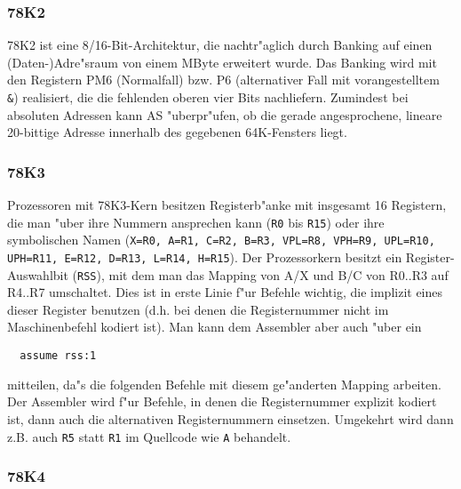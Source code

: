 \documentclass[12pt,a4paper,twoside]{report}
\newcommand{\tty}[1]{{\tt #1}}
\begin{document}

\subsubsection{78K2}

78K2 ist eine 8/16-Bit-Architektur, die nachtr"aglich durch Banking auf
einen (Daten-)Adre"sraum von einem MByte erweitert wurde.  Das Banking
wird mit den Registern PM6 (Normalfall) bzw. P6 (alternativer Fall mit
vorangestelltem \verb!&!) realisiert, die die fehlenden oberen vier Bits
nachliefern.  Zumindest bei absoluten Adressen kann AS "uberpr"ufen, ob
die gerade angesprochene, lineare 20-bittige Adresse innerhalb des
gegebenen 64K-Fensters liegt.


\subsubsection{78K3}

Prozessoren mit 78K3-Kern besitzen Registerb"anke mit insgesamt 16 Registern,
die man "uber ihre Nummern ansprechen kann (\tty{R0} bis \tty{R15}) oder ihre symbolischen
Namen (\tty{X=R0, A=R1, C=R2, B=R3, VPL=R8, VPH=R9, UPL=R10, UPH=R11, E=R12,
D=R13, L=R14, H=R15}).  Der Prozessorkern besitzt ein Register-Auswahlbit
(\tty{RSS}), mit dem man das Mapping von A/X und B/C von R0..R3 auf R4..R7
umschaltet.  Dies ist in erste Linie f"ur Befehle wichtig, die implizit eines
dieser Register benutzen (d.h. bei denen die Registernummer nicht im Maschinenbefehl
kodiert ist).  Man kann dem Assembler aber auch "uber ein

\begin{verbatim}
  assume rss:1
\end{verbatim}

mitteilen, da"s die folgenden Befehle mit diesem ge"anderten Mapping arbeiten.  Der
Assembler wird f"ur Befehle, in denen die Registernummer explizit kodiert ist, dann
auch die alternativen Registernummern einsetzen.  Umgekehrt wird dann z.B. auch
\tty{R5} statt \tty{R1} im Quellcode wie \tty{A} behandelt.


\subsubsection{78K4}
\end{document}
